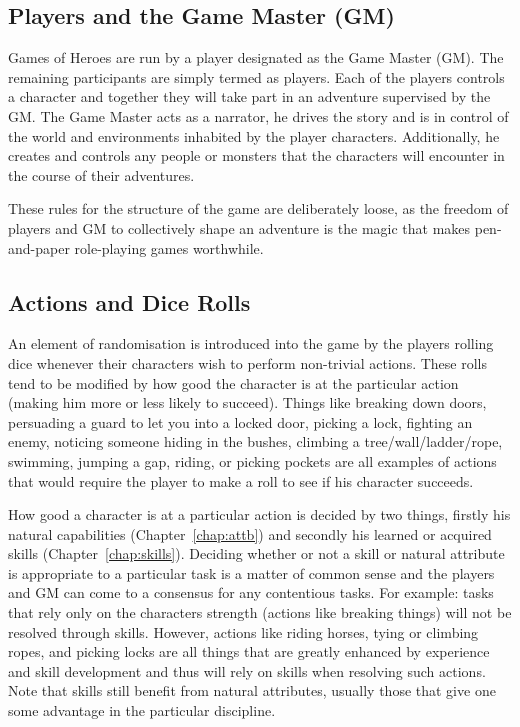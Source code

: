 \documentclass[a4paper,10pt,oneside]{book}
\begin{document}
\subsection{Players and the Game Master (GM)}
Games of Heroes are run by a player designated as the Game Master (GM). The remaining participants are simply termed as players. Each of the players controls a character and together they will take part in an adventure supervised by the GM. The Game Master acts as a narrator, he drives the story and is in control of the world and environments inhabited by the player characters. Additionally, he creates and controls any people or monsters that the characters will encounter in the course of their adventures. 

These rules for the structure of the game are deliberately loose, as the freedom of players and GM to collectively shape an adventure is the magic that makes pen-and-paper role-playing games worthwhile.

\subsection{Actions and Dice Rolls}
An element of randomisation is introduced into the game by the players rolling dice whenever their characters wish to perform non-trivial actions. These rolls tend to be modified by how good the character is at the particular action (making him more or less likely to succeed). Things like breaking down doors, persuading a guard to let you into a locked door, picking a lock, fighting an enemy, noticing someone hiding in the bushes, climbing a tree/wall/ladder/rope, swimming, jumping a gap, riding, or picking pockets are all examples of actions that would require the player to make a roll to see if his character succeeds. 

How good a character is at a particular action is decided by two things, firstly his natural capabilities (Chapter~\ref{chap:attb}) and secondly his learned or acquired skills (Chapter~\ref{chap:skills}). Deciding whether or not a skill or natural attribute is appropriate to a particular task is a matter of common sense and the players and GM can come to a consensus for any contentious tasks. For example: tasks that rely only on the characters strength (actions like breaking things) will not be resolved through skills. However, actions like riding horses, tying or climbing ropes, and picking locks are all things that are greatly enhanced by experience and skill development and thus will rely on skills when resolving such actions. Note that skills still benefit from natural attributes, usually those that give one some advantage in the particular discipline. 
\end{document}
